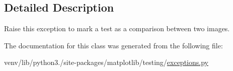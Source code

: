 \subsection{Detailed Description}
\begin{DoxyVerb}Raise this exception to mark a test as a comparison between two images.
\end{DoxyVerb}
 

The documentation for this class was generated from the following file\+:\begin{DoxyCompactItemize}
\item 
venv/lib/python3./site-\/packages/matplotlib/testing/\hyperlink{matplotlib_2testing_2exceptions_8py}{exceptions.\+py}\end{DoxyCompactItemize}
